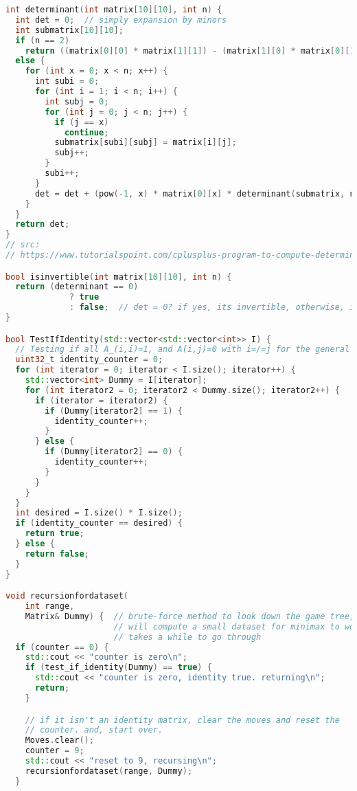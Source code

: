 \documentclass{article}
\begin{document}
\begin{lstlisting}[language=C++]
int determinant(int matrix[10][10], int n) {
  int det = 0;  // simply expansion by minors
  int submatrix[10][10];
  if (n == 2)
    return ((matrix[0][0] * matrix[1][1]) - (matrix[1][0] * matrix[0][1]));
  else {
    for (int x = 0; x < n; x++) {
      int subi = 0;
      for (int i = 1; i < n; i++) {
        int subj = 0;
        for (int j = 0; j < n; j++) {
          if (j == x)
            continue;
          submatrix[subi][subj] = matrix[i][j];
          subj++;
        }
        subi++;
      }
      det = det + (pow(-1, x) * matrix[0][x] * determinant(submatrix, n - 1));
    }
  }
  return det;
}
// src:
// https://www.tutorialspoint.com/cplusplus-program-to-compute-determinant-of-a-matrix

bool isinvertible(int matrix[10][10], int n) {
  return (determinant == 0)
             ? true
             : false;  // det = 0? if yes, its invertible, otherwise, it's not
}

bool TestIfIdentity(std::vector<std::vector<int>> I) {
  // Testing if all A_(i,i)=1, and A(i,j)=0 with i=/=j for the general case
  uint32_t identity_counter = 0;
  for (int iterator = 0; iterator < I.size(); iterator++) {
    std::vector<int> Dummy = I[iterator];
    for (int iterator2 = 0; iterator2 < Dummy.size(); iterator2++) {
      if (iterator = iterator2) {
        if (Dummy[iterator2] == 1) {
          identity_counter++;
        }
      } else {
        if (Dummy[iterator2] == 0) {
          identity_counter++;
        }
      }
    }
  }
  int desired = I.size() * I.size();
  if (identity_counter == desired) {
    return true;
  } else {
    return false;
  }
}

void recursionfordataset(
    int range,
    Matrix& Dummy) {  // brute-force method to look down the game tree; this
                      // will compute a small dataset for minimax to work with -
                      // takes a while to go through
  if (counter == 0) {
    std::cout << "counter is zero\n";
    if (test_if_identity(Dummy) == true) {
      std::cout << "counter is zero, identity true. returning\n";
      return;
    }

    // if it isn't an identity matrix, clear the moves and reset the
    // counter. and, start over.
    Moves.clear();
    counter = 9;
    std::cout << "reset to 9, recursing\n";
    recursionfordataset(range, Dummy);
  }


\end{lstlisting}
\end{document}
